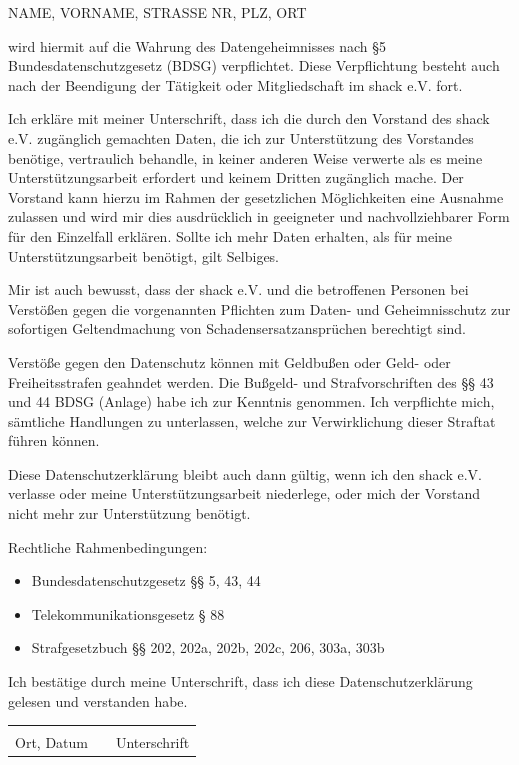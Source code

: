 \documentclass[a4paper]{dinbrief}
\date{\ }
\begin{document}

\begin{letter}{
	}

\subject{}
\opening{}
NAME, VORNAME, STRASSE NR, PLZ, ORT

wird hiermit auf die Wahrung des Datengeheimnisses nach §5 Bundesdatenschutzgesetz (BDSG) verpflichtet.
Diese Verpflichtung besteht auch nach der Beendigung der Tätigkeit oder Mitgliedschaft im shack e.V. fort.

Ich erkläre mit meiner Unterschrift, dass ich die durch den Vorstand des shack e.V. zugänglich gemachten Daten, die ich zur Unterstützung des Vorstandes benötige, vertraulich behandle, in keiner anderen Weise verwerte als es meine Unterstützungsarbeit erfordert und keinem Dritten zugänglich mache. Der Vorstand kann hierzu im Rahmen der gesetzlichen Möglichkeiten eine Ausnahme zulassen und wird mir dies ausdrücklich in geeigneter und nachvollziehbarer Form für den Einzelfall erklären. Sollte ich mehr Daten erhalten, als für meine Unterstützungsarbeit benötigt, gilt Selbiges.

Mir ist auch bewusst, dass der shack e.V. und die betroffenen Personen bei Verstößen gegen die vorgenannten Pflichten zum Daten- und Geheimnisschutz zur sofortigen Geltendmachung von Schadensersatzansprüchen berechtigt sind.

Verstöße gegen den Datenschutz können mit Geldbußen oder Geld- oder Freiheitsstrafen geahndet werden. Die Bußgeld- und Strafvorschriften des §§ 43 und 44 BDSG (Anlage) habe ich zur Kenntnis genommen. Ich verpflichte mich, sämtliche Handlungen zu unterlassen, welche zur Verwirklichung dieser Straftat führen können. 

Diese Datenschutzerklärung bleibt auch dann gültig, wenn ich den shack e.V. verlasse oder meine Unterstützungsarbeit niederlege, oder mich der Vorstand nicht mehr zur Unterstützung benötigt.

Rechtliche Rahmenbedingungen:
\begin{itemize}
	\item Bundesdatenschutzgesetz §§ 5, 43, 44
	\item Telekommunikationsgesetz § 88
	\item Strafgesetzbuch §§ 202, 202a, 202b, 202c, 206, 303a, 303b
\end{itemize}


Ich bestätige durch meine Unterschrift, dass ich diese Datenschutzerklärung gelesen und verstanden habe.

\vfill

\begin{tabular}{lp{2em}l}
	 \hspace{3cm}   && \hspace{3cm} \\\cline{1-1}\cline{3-3}
	 Ort, Datum     && Unterschrift
\end{tabular}

\closing{}
\end{letter}
\end{document}
